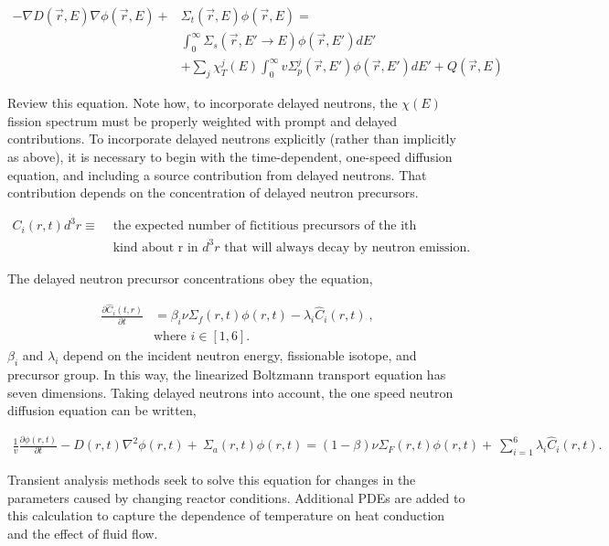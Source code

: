 \documentclass[12pt]{article}
\begin{document}
\begin{align}
-\nabla D(\vec{r},E)\nabla\phi(\vec{r},E) +& \Sigma_t(\vec{r},E)\phi(\vec{r},E) 
= \nonumber\\
&\int_0^\infty \Sigma_s(\vec{r},E'\rightarrow E)\phi(\vec{r},E')dE'\nonumber\\ 
&+ \sum_j \chi_T^j(E)\int_0^\infty v\Sigma_p^j(\vec{r},E')\phi(\vec{r},E')dE' + 
Q(\vec{r},E)
\end{align}

Review this equation. Note how, to incorporate delayed neutrons, the $\chi (E)$ 
fission spectrum must be properly weighted with prompt and delayed 
contributions. To incorporate delayed neutrons explicitly (rather than 
implicitly as above), it is necessary to begin with the time-dependent, 
one-speed diffusion equation, and including a source contribution from delayed 
neutrons. That contribution depends on the concentration of delayed neutron 
precursors.  

\begin{align}
C_i(r,t)d^3r \equiv &\mbox{ the expected number of fictitious precursors of the 
ith}\\
&\mbox{ kind about r in }d^3r\mbox{ that will always decay by neutron emission.}\nonumber
\end{align}

The delayed neutron precursor concentrations obey the equation,

\begin{align}
  \frac{\partial \hat{C}_i(t,r)}{\partial t} &=
  \beta_i\nu\Sigma_f(r,t)\phi(r,t) -
  \lambda_i\hat{C}_i(r,t)\:,\\
  &\text{where }  i\in [1,6].
  \label{delayed_precursors}
\end{align}
$\beta_i$ and $\lambda_i$ depend on the incident neutron energy, fissionable
isotope, and precursor group.  In this way, the  linearized Boltzmann transport
equation has seven dimensions.  Taking delayed neutrons into account, the one
speed neutron diffusion equation can be written,

\begin{align}
  \frac{1}{v}\frac{\partial \phi(r,t)}{\partial t} - D(r,t)\nabla^2\phi(r,t) + \
  \Sigma_a(r,t)\phi(r,t) = (1-\beta)\nu\Sigma_F(r,t)\phi(r,t) + \
  \sum_{i=1}^6\lambda_i\hat{C}_i(r,t).
  \label{boltz_one_speed}
\end{align}

Transient analysis methods seek to solve this equation for changes in the
parameters caused by changing reactor conditions. Additional PDEs are added to
this calculation to capture the dependence of temperature on heat conduction and
the effect of fluid flow.
\end{document}
